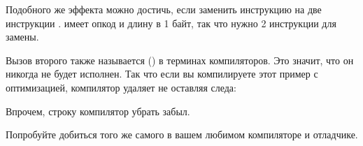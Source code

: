 Подобного же эффекта можно достичь, если заменить инструкцию \JMP на две инструкции \NOP.
\NOP имеет опкод  и длину в 1 байт, так что нужно 2 инструкции для замены.


Вызов второго \printf также называется  () 
в терминах компиляторов.
Это значит, что он никогда не будет исполнен.
Так что если вы компилируете этот пример с оптимизацией, компилятор удаляет  не оставляя следа:



Впрочем, строку  компилятор убрать забыл.


\sectionold{\Exercise}

Попробуйте добиться того же самого в вашем любимом компиляторе и отладчике.

